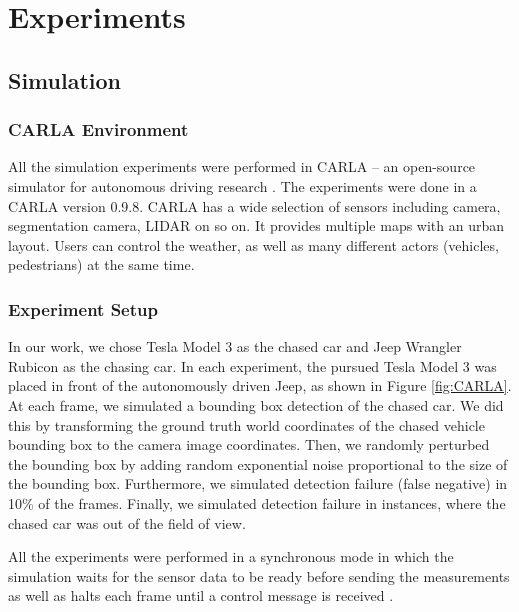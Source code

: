 \documentclass{ctuthesis/ctuthesis}
\begin{document}
\chapter{Experiments}\label{s:experiments}
\section{Simulation}
\subsection{CARLA Environment}
All the simulation experiments were performed in CARLA -- an open-source simulator for autonomous driving research \cite{CARLA}. The experiments were done in a CARLA version 0.9.8. CARLA has a wide selection of sensors including camera, segmentation camera, LIDAR on so on. It provides multiple maps with an urban layout. Users can control the weather, as well as many different actors (vehicles, pedestrians) at the same time. \par




\subsection{Experiment Setup}
In our work, we chose Tesla Model 3 as the chased car and Jeep Wrangler Rubicon as the chasing car. In each experiment, the pursued Tesla Model 3 was placed in front of the autonomously driven Jeep, as shown in Figure \ref{fig:CARLA}. At each frame, we simulated a bounding box detection of the chased car. We did this by transforming the ground truth world coordinates of the chased vehicle bounding box to the camera image coordinates. Then, we randomly perturbed the bounding box by adding random exponential noise proportional to the size of the bounding box. Furthermore, we simulated detection failure (false negative) in 10\% of the frames. Finally, we simulated detection failure in instances, where the chased car was out of the field of view.\par

All the experiments were performed in a synchronous mode in which the simulation waits for the sensor data to be ready before sending the measurements as well as halts each frame until a control message is received \cite{CARLA}. \par
\end{document}
